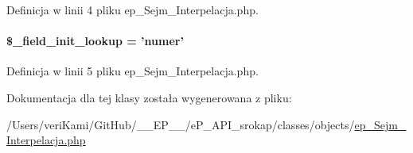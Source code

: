 Definicja w linii 4 pliku ep\-\_\-\-Sejm\-\_\-\-Interpelacja.\-php.

\hypertarget{classep___sejm___interpelacja_a4a4d54ae35428077a7c61ec8a5139af3}{
\paragraph[{\$\-\_\-field\-\_\-init\-\_\-lookup}]{\setlength{\rightskip}{0pt plus 5cm}\$\-\_\-field\-\_\-init\-\_\-lookup = 'numer'}}\label{classep___sejm___interpelacja_a4a4d54ae35428077a7c61ec8a5139af3}


Definicja w linii 5 pliku ep\-\_\-\-Sejm\-\_\-\-Interpelacja.\-php.



Dokumentacja dla tej klasy została wygenerowana z pliku\-:\begin{DoxyCompactItemize}
\item 
/\-Users/veri\-Kami/\-Git\-Hub/\-\_\-\-\_\-\-E\-P\-\_\-\-\_\-/e\-P\-\_\-\-A\-P\-I\-\_\-srokap/classes/objects/\hyperlink{ep___sejm___interpelacja_8php}{ep\-\_\-\-Sejm\-\_\-\-Interpelacja.\-php}\end{DoxyCompactItemize}
